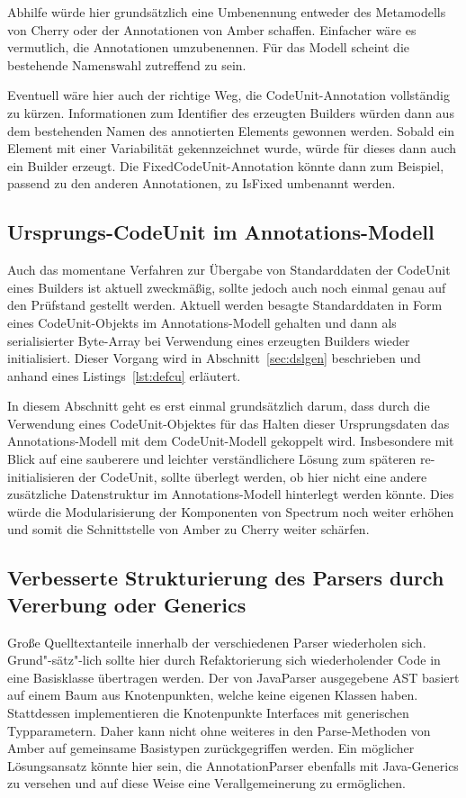 \documentclass[12pt,oneside,a4paper,parskip]{scrbook}
\begin{document}
Abhilfe würde hier grundsätzlich eine Umbenennung entweder des Metamodells von Cherry oder der Annotationen von Amber schaffen. Einfacher wäre es vermutlich, die Annotationen umzubenennen. Für das Modell scheint die bestehende Namenswahl zutreffend zu sein.

Eventuell wäre hier auch der richtige Weg, die CodeUnit-Annotation vollständig zu kürzen. Informationen zum Identifier des erzeugten Builders würden dann aus dem bestehenden Namen des annotierten Elements gewonnen werden. Sobald ein Element mit einer Variabilität gekennzeichnet wurde, würde für dieses dann auch ein Builder erzeugt. Die FixedCodeUnit-Annotation könnte dann zum Beispiel, passend zu den anderen Annotationen, zu IsFixed umbenannt werden.

\subsection{Ursprungs-CodeUnit im Annotations-Modell}

Auch das momentane Verfahren zur Übergabe von Standarddaten der CodeUnit eines Builders ist aktuell zweckmäßig, sollte jedoch auch noch einmal genau auf den Prüfstand gestellt werden. Aktuell werden besagte Standarddaten in Form eines CodeUnit-Objekts im Annotations-Modell gehalten und dann als serialisierter Byte-Array bei Verwendung eines erzeugten Builders wieder initialisiert. Dieser Vorgang wird in Abschnitt~\ref{sec:dslgen} beschrieben und anhand eines Listings~\ref{lst:defcu} erläutert.

In diesem Abschnitt geht es erst einmal grundsätzlich darum, dass durch die Verwendung eines CodeUnit-Objektes für das Halten dieser Ursprungsdaten das Annotations-Modell mit dem CodeUnit-Modell gekoppelt wird. Insbesondere mit Blick auf eine sauberere und leichter verständlichere Lösung zum späteren re-initialisieren der CodeUnit, sollte überlegt werden, ob hier nicht eine andere zusätzliche Datenstruktur im Annotations-Modell hinterlegt werden könnte. Dies würde die Modularisierung der Komponenten von Spectrum noch weiter erhöhen und somit die Schnittstelle von Amber zu Cherry weiter schärfen.

\subsection{Verbesserte Strukturierung des Parsers durch Vererbung oder Generics}

Große Quelltextanteile innerhalb der verschiedenen Parser wiederholen sich. Grund"-sätz"-lich sollte hier durch Refaktorierung sich wiederholender Code in eine Basisklasse übertragen werden. Der von JavaParser ausgegebene AST basiert auf einem Baum aus Knotenpunkten, welche keine eigenen Klassen haben. Stattdessen implementieren die Knotenpunkte Interfaces mit generischen Typparametern. Daher kann nicht ohne weiteres in den Parse-Methoden von Amber auf gemeinsame Basistypen zurückgegriffen werden. Ein möglicher Lösungsansatz könnte hier sein, die AnnotationParser ebenfalls mit Java-Generics zu versehen und auf diese Weise eine Verallgemeinerung zu ermöglichen.
\end{document}
